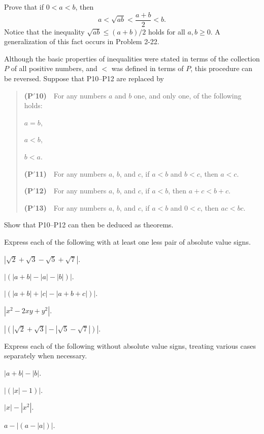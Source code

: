  Prove that if $0 < a < b$, then
\[ a < \sqrt{ab} < \frac{a+b}{2} < b. \]
Notice that the inequality $\sqrt{ab} \leq (a+b)/2$ holds for all $a, b \geq 0$.
A generalization of this fact occurs in Problem 2-22.

 Although the basic properties of inequalities were stated in terms
of the collection $P$ of all positive numbers, and $<$ was defined in terms of
$P$, this procedure can be reversed. Suppose that P10--P12 are replaced by
\begin{quote}
\textbf{(P$'$10)}\ \ For any numbers $a$ and $b$ one, and only one, of the
following holds:
\begin{romans}
\item $a = b$,
\item $a < b$,
\item $b < a$.
\end{romans}

\textbf{(P$'$11)}\ \ For any numbers $a$, $b$, and $c$, if $a < b$ and
$b < c$, then $a < c$.

\textbf{(P$'$12)}\ \ For any numbers $a$, $b$, and $c$, if $a < b$, then
$a + c < b + c$.

\textbf{(P$'$13)}\ \ For any numbers $a$, $b$, and $c$, if $a < b$ and
$0 < c$, then $ac < bc$.
\end{quote}
Show that P10--P12 can then be deduced as theorems.

 Express each of the following with at least one less pair of
absolute value signs.
\begin{romans}
\item $|\sqrt{2} + \sqrt{3} - \sqrt{5} + \sqrt{7}|$.
\item $|(|a+b| - |a| - |b|)|$.
\item $|(|a+b| + |c| - |a+b+c|)|$.
\item $|x^2 - 2xy + y^2|$.
\item $|(|\sqrt{2} + \sqrt{3}| - |\sqrt{5} - \sqrt{7}|)|$.
\end{romans}

 Express each of the following without absolute value signs,
treating various cases separately when necessary.
\begin{romans}
\item $|a+b| - |b|$.
\item $|(|x|-1)|$.
\item $|x| - |x^2|$.
\item $a - |(a-|a|)|$.
\end{romans}

